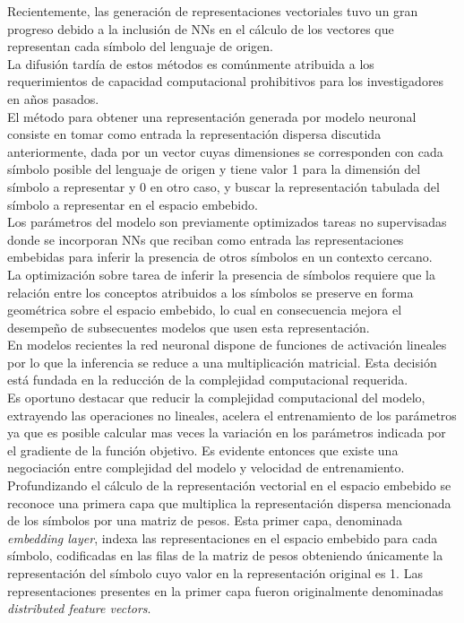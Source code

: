 \documentclass{article}
\begin{document}
	Recientemente, las generación de representaciones vectoriales tuvo un gran progreso debido a la inclusión de NNs en el cálculo de los vectores que representan cada símbolo del lenguaje de origen\cite{37BengioNeuralEmbeding}\cite{38MikolovFormer}\cite{39GlovePennington}.\\
	La difusión tardía de estos métodos es comúnmente atribuida a los requerimientos de capacidad computacional prohibitivos para los investigadores en años pasados.\\
	
	El método para obtener una representación generada por modelo neuronal consiste en tomar como entrada la representación dispersa discutida anteriormente, dada por un vector cuyas dimensiones se corresponden con cada símbolo posible del lenguaje de origen y tiene valor 1 para la dimensión del símbolo a representar y 0 en otro caso, y buscar la representación tabulada del símbolo a representar en el espacio embebido.\\
	Los parámetros del modelo son previamente optimizados tareas no supervisadas donde se incorporan NNs que reciban como entrada las representaciones embebidas para inferir la presencia de otros símbolos en un contexto cercano. \\
	La optimización sobre tarea de inferir la presencia de símbolos requiere que la relación entre los conceptos atribuidos a los símbolos se preserve en forma geométrica sobre el espacio embebido, lo cual en consecuencia mejora el desempeño de subsecuentes modelos que usen esta representación\cite{40CollobetWeston}.\\
	
	En modelos recientes la red neuronal dispone de funciones de activación lineales por lo que la inferencia se reduce a una multiplicación matricial. Esta decisión está fundada en la reducción de la complejidad computacional requerida.\\
	Es oportuno destacar que reducir la complejidad computacional del modelo, extrayendo las operaciones no lineales, acelera el entrenamiento de los parámetros ya que es posible calcular mas veces la variación en los parámetros indicada por el gradiente de la función objetivo. Es evidente entonces que existe una negociación entre complejidad del modelo y velocidad de entrenamiento.\\
	
	Profundizando el cálculo de la representación vectorial en el espacio embebido se reconoce una primera capa que multiplica la representación dispersa mencionada de los símbolos por una matriz de pesos. Esta primer capa, denominada \textit{embedding layer}, indexa las representaciones en el espacio embebido para cada símbolo, codificadas en las filas de la matriz de pesos obteniendo únicamente la representación del símbolo cuyo valor en la representación original es 1. Las representaciones presentes en la primer capa fueron originalmente denominadas \textit{distributed feature vectors}.\\
	
\end{document}

